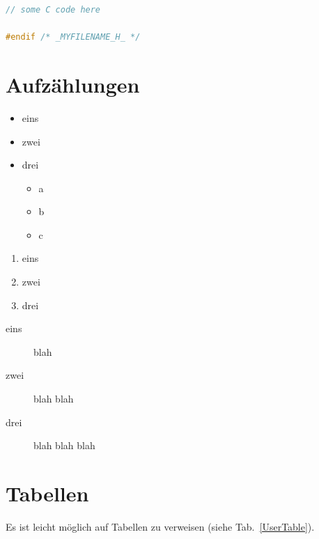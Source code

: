 \begin{appendix}
\begin{lstlisting}[language=C, caption={Ein einfaches C Programm.}]
	// some C code here

#endif /* _MYFILENAME_H_ */
\end{lstlisting}

\vspace{1cm}



\newpage

\section{Aufzählungen}

\begin{itemize}
  \item eins
  \item zwei
  \item drei
  \begin{itemize}
    \item a
    \item b
    \item c
  \end{itemize}
\end{itemize}

\begin{enumerate}
  \item eins
  \item zwei
  \item drei
\end{enumerate}


\begin{description}
\item[eins] blah
\item[zwei] blah blah
\item[drei] blah blah blah 
\end{description}

\newpage


\section{Tabellen}

Es ist leicht möglich auf Tabellen zu verweisen (siehe Tab.~\ref{UserTable}).


\end{appendix}
